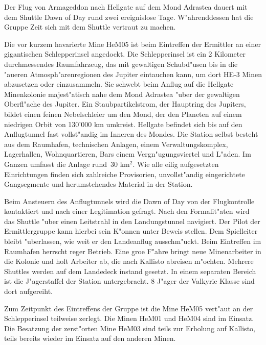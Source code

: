 \pagebreak
{}

Der Flug von Armageddon nach Hellgate auf dem Mond Adrastea dauert mit dem Shuttle Dawn of Day rund zwei ereignislose Tage. W"ahrenddessen hat die Gruppe Zeit sich mit dem Shuttle vertraut zu machen. 

Die vor kurzem havarierte Mine HeM05 ist beim Eintreffen der Ermittler an einer gigantischen Schlepperinsel  angedockt. Die Schlepperinsel ist ein 2 Kilometer durchmessendes Raumfahrzeug, das mit gewaltigen Schubd"usen bis in die "au\3eren Atmosph"arenregionen des Jupiter eintauchen kann, um dort HE-3 Minen abzusetzen oder einzusammeln. Sie schwebt beim Anflug auf die Hellgate Minenkolonie majest"atisch nahe dem Mond Adrastea "uber der gewaltigen Oberfl"ache des Jupiter. Ein Staubpartikelstrom, der Hauptring des Jupiters, bildet einen feinen Nebelschleier um den Mond, der den Planeten auf einem niedrigen Orbit von 130'000 km umkreist. Hellgate befindet sich bis auf den Anflugtunnel fast vollst"andig im Inneren des Mondes. Die Station selbst besteht aus dem Raumhafen, technischen Anlagen, einem Verwaltungskomplex, Lagerhallen, Wohnquartieren, Bars einem Vergn"ugungsviertel und L"aden. Im Ganzen umfasst die Anlage rund~30 km$^{2}$. Wie alle eilig aufgesetzten Einrichtungen finden sich zahlreiche Provisorien, unvollst"andig eingerichtete Gangsegmente und herumstehendes Material in der Station.

Beim Ansteuern des Anflugtunnels wird die Dawn of Day von der Flugkontrolle kontaktiert und nach einer Legitimation gefragt. Nach den  Formalit"aten wird das Shuttle "uber einen Leitstrahl in den Landungstunnel navigiert. Der Pilot der Ermittlergruppe kann hierbei sein K"onnen unter Beweis stellen. Dem Spielleiter bleibt "uberlassen, wie weit er den Landeanflug ausschm"uckt. Beim Eintreffen im Raumhafen herrscht reger Betrieb. Eine gro\3e F"ahre bringt neue Minenarbeiter in die Kolonie und holt Arbeiter ab, die nach Kallisto abreisen m"ochten. Mehrere Shuttles werden auf dem Landedeck instand gesetzt. In einem separaten Bereich ist die J"agerstaffel der Station untergebracht. 8 J"ager der Valkyrie Klasse sind dort aufgereiht. 

Zum Zeitpunkt des Eintreffens der Gruppe ist die Mine HeM05 vert"aut an der Schlepperinsel teilweise zerlegt. Die Minen HeM01 und HeM04 sind im Einsatz. Die Besatzung der zerst"orten Mine HeM03 sind teils zur Erholung auf Kallisto, teils bereits wieder im Einsatz auf den anderen Minen.

